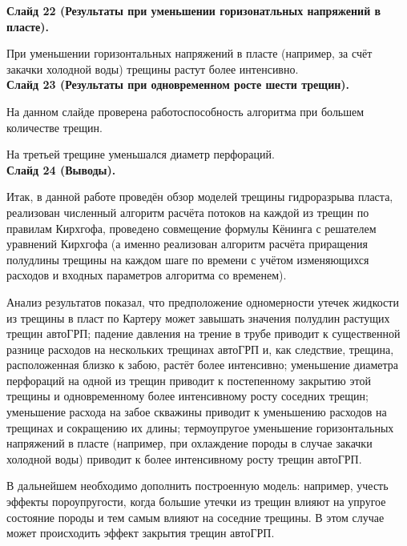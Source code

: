 \documentclass[a4paper, 12pt]{article}
\begin{document}
\textbf{Слайд 22 (Результаты при уменьшении горизонатльных напряжений в пласте).}

При уменьшении горизонтальных напряжений в пласте (например, за счёт закачки холодной воды) трещины растут более интенсивно.
\\


\textbf{Слайд 23 (Результаты при одновременном росте шести трещин).}

На данном слайде проверена работоспособность алгоритма при большем количестве трещин.

На третьей трещине уменьшался диаметр перфораций.
\\


\textbf{Слайд 24 (Выводы).}

Итак, в данной работе проведён обзор моделей трещины гидроразрыва пласта, реализован численный алгоритм расчёта потоков на каждой из трещин по правилам Кирхгофа, проведено совмещение формулы Кёнинга с решателем уравнений Кирхгофа (а именно реализован алгоритм расчёта приращения полудлины трещины на каждом шаге по времени с учётом изменяющихся расходов и входных параметров алгоритма со временем).

Анализ результатов показал, что предположение одномерности утечек жидкости из трещины в пласт по Картеру может завышать значения полудлин растущих трещин автоГРП; падение давления на трение в трубе приводит к существенной разнице расходов на нескольких трещинах автоГРП и, как следствие, трещина, расположенная близко к забою, растёт более интенсивно; уменьшение диаметра перфораций на одной из трещин приводит к постепенному закрытию этой трещины и одновременному более интенсивному росту соседних трещин; уменьшение расхода на забое скважины приводит к уменьшению расходов на трещинах и сокращению их длины; термоупругое уменьшение горизонтальных напряжений в пласте (например, при охлаждение породы в случае закачки холодной воды) приводит к более интенсивному росту трещин автоГРП.

В дальнейшем необходимо дополнить построенную модель: например, учесть эффекты пороупругости, когда большие утечки из трещин влияют на упругое состояние породы и тем самым влияют на соседние трещины.
В этом случае может происходить эффект закрытия трещин автоГРП.












\newpage
\ 
\newpage
\end{document}
